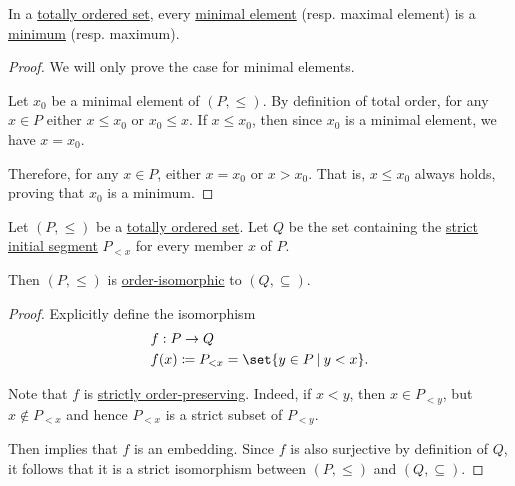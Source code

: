 \begin{proposition}\label{thm:totally_ordered_minimal_element_is_minimum}
  In a \hyperref[def:totally_ordered_set]{totally ordered set}, every \hyperref[def:extremal_points/maximal_and_minimal_element]{minimal element} (resp. maximal element) is a \hyperref[def:extremal_points/maximum_and_minimum]{minimum} (resp. maximum).
\end{proposition}
\begin{proof}
  We will only prove the case for minimal elements.

  Let \( x_0 \) be a minimal element of \( (P, \leq) \). By definition of total order, for any \( x \in P \) either \( x \leq x_0 \) or \( x_0 \leq x \). If \( x \leq x_0 \), then since \( x_0 \) is a minimal element, we have \( x = x_0 \).

  Therefore, for any \( x \in P \), either \( x = x_0 \) or \( x > x_0 \). That is, \( x \leq x_0 \) always holds, proving that \( x_0 \) is a minimum.
\end{proof}

\begin{proposition}\label{thm:totally_ordered_segment_isomorphism}
  Let \( (P, \leq) \) be a \hyperref[def:totally_ordered_set]{totally ordered set}. Let \( Q \) be the set containing the \hyperref[def:order_interval/unbounded]{strict initial segment} \( P_{<x} \) for every member \( x \) of \( P \).

  Then \( (P, \leq) \) is \hyperref[def:order_function/isomorphism]{order-isomorphic} to \( (Q, \subseteq) \).
\end{proposition}
\begin{proof}
  Explicitly define the isomorphism
  \begin{equation*}
    \begin{aligned}
      &f: P \to Q \\
      &f(x) \coloneqq P_{<x} = \set{ y \in P \given y < x }.
    \end{aligned}
  \end{equation*}

  Note that \( f \) is \hyperref[def:order_function/preserving]{strictly order-preserving}. Indeed, if \( x < y \), then \( x \in P_{<y} \), but \( x \not\in P_{<x} \) and hence \( P_{<x} \) is a strict subset of \( P_{<y} \).

  Then  implies that \( f \) is an embedding. Since \( f \) is also surjective by definition of \( Q \), it follows that it is a strict isomorphism between \( (P, \leq) \) and \( (Q, \subseteq) \).
\end{proof}

